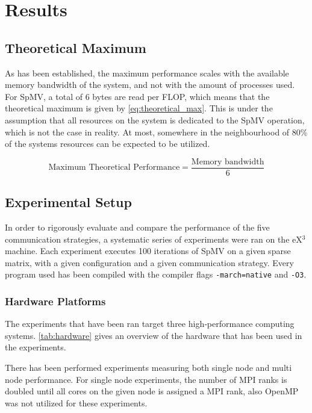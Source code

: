 \chapter{Results} \label{results}

\section{Theoretical Maximum}
As has been established, the maximum performance scales with the available memory bandwidth of the system, and not with the amount of processes used. For SpMV, a total of 6 bytes are read per FLOP, which means that the theoretical maximum is given by \ref{eq:theoretical_max}. This is under the assumption that all resources on the system is dedicated to the SpMV operation, which is not the case in reality. At most, somewhere in the neighbourhood of 80\% of the systems resources can be expected to be utilized.

\begin{equation}
\text{Maximum Theoretical Performance} = \frac{\text{Memory bandwidth}}{6}
\label{eq:theoretical_max}
\end{equation}


\section{Experimental Setup}
In order to rigorously evaluate and compare the performance of the five communication strategies, a systematic series of experiments were ran on the eX\(^{3}\) machine. Each experiment executes 100 iterations of SpMV on a given sparse matrix, with a given configuration and a given communication strategy. Every program used has been compiled with the compiler flags \texttt{-march=native} and \texttt{-O3}.
 
\subsection{Hardware Platforms}

The experiments that have been ran target three high‐performance computing systems. \autoref{tab:hardware} gives an overview of the hardware that has been used in the experiments.




There has been performed experiments measuring both single node and multi node performance. For single node experiments, the number of MPI ranks is doubled until all cores on the given node is assigned a MPI rank, also OpenMP was not utilized for these experiments.
\medskip

